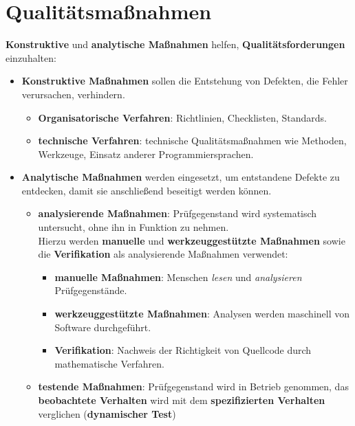 \section{Qualitätsmaßnahmen}

\begin{tcolorbox}[title=Qualitätsmaßnahmen]
    \textbf{Konstruktive} und \textbf{analytische Maßnahmen} helfen, \textbf{Qualitätsforderungen} einzuhalten:

    \begin{itemize}
            \item  \textbf{Konstruktive Maßnahmen} sollen die Entstehung von Defekten, die Fehler verursachen, verhindern.
            \begin{itemize}
                \item \textbf{Organisatorische Verfahren}: Richtlinien, Checklisten, Standards.
                \item \textbf{technische Verfahren}: technische Qualitätsmaßnahmen wie Methoden, Werkzeuge, Einsatz anderer Programmiersprachen.
            \end{itemize}
            \item \textbf{Analytische Maßnahmen} werden eingesetzt, um entstandene Defekte zu entdecken, damit sie anschließend beseitigt werden können.
            \begin{itemize}
                \item \textbf{analysierende Maßnahmen}: Prüfgegenstand wird systematisch untersucht, ohne ihn in Funktion zu nehmen.\\
                Hierzu werden \textbf{manuelle} und \textbf{werkzeuggestützte Maßnahmen} sowie die \textbf{Verifikation} als analysierende Maßnahmen verwendet:
                \begin{itemize}
                    \item \textbf{manuelle Maßnahmen}: Menschen \textit{lesen} und \textit{analysieren} Prüfgegenstände.
                    \item \textbf{werkzeuggestützte Maßnahmen}: Analysen werden maschinell von Software durchgeführt.
                    \item \textbf{Verifikation}: Nachweis der Richtigkeit von Quellcode durch mathematische Verfahren.
                \end{itemize}
                \item  \textbf{testende Maßnahmen}: Prüfgegenstand wird in Betrieb genommen, das \textbf{beobachtete Verhalten} wird mit dem \textbf{spezifizierten Verhalten} verglichen (\textbf{dynamischer Test})
            \end{itemize}
        \end{itemize}


\end{tcolorbox}


